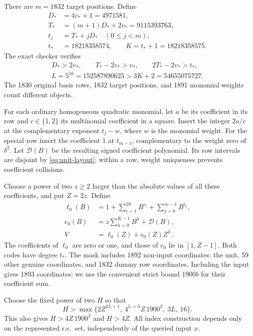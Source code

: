 There are $m=1832$ target positions. Define
\begin{align*}
 D_*&=4v_*+1=4971581,\\
 T_*&=(m+1)D_*+2v_*=9115393763,\\
 t_j&=T_*+jD_*\quad(0\le j<m),\\
 t_*&=18218358574,\qquad K=t_*+1=18218358575.
\end{align*}
The exact checker verifies
\begin{equation}\label{eq:unit-layout}
\begin{gathered}
 D_*>2v_*,\qquad T_*-2v_*>v_*,\qquad
 2T_*-2v_*>t_*,\\
 L=5^{16}=152587890625>3K+2=54655075727.
\end{gathered}
\end{equation}
The 1830 original basis rows, 1832 target positions, and 1891 monomial
weights count different objects.

For each ordinary homogeneous quadratic monomial, let $a$ be its
coefficient in its row and $c\in\{1,2\}$ its multinomial coefficient
in a square. Insert the integer $2a/c$ at the complementary exponent
$t_j-w$, where $w$ is the monomial weight. For the special row insert
the coefficient $1$ at $t_{m-1}$, complementary to the weight zero
of $\delta^2$. Let $\mathcal D(B)$ be the resulting signed coefficient
polynomial. Its row intervals are disjoint by
\eqref{eq:unit-layout}; within a row, weight uniqueness prevents
coefficient collisions.

Choose a power of two $z\ge2$ larger than the absolute values of all
these coefficients, and put $Z=2z$. Define
\begin{align*}
 \ell_0(B)&=1+\sum_{i=1}^{59}B^{v_i}
                  +\sum_{j=0}^{m-1}B^{t_j},\\
 e_0(B)&=z\sum_{h=0}^{K-1}B^h+\mathcal D(B),\\
 V&=\ell_0(Z)+e_0(Z)Z^L.
\end{align*}
The coefficients of $\ell_0$ are zero or one, and those of $e_0$ lie
in $[1,Z-1]$. Both codes have degree $t_*$. The mask includes 1892
non-input coordinates: the unit, 59 other genuine coordinates, and
1832 dummy row coordinates. Including the input gives 1893 coordinates;
we use the convenient strict bound $1900b$ for their coefficient sum.

Choose the fixed power of two $H$ so that
\begin{equation}\label{eq:unit-H}
 H>\max\{2Z^{2L+1},\ 4^{t_*+3}Z\,1900^2,\ 3L,\ 16\}.
\end{equation}
This also gives $H>4Z\,1900^2$ and $H>4Z$.
All index construction depends only on the represented r.e.\ set,
independently of the queried input $x$.

